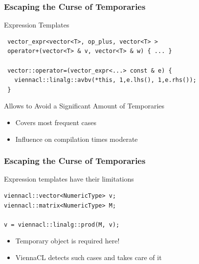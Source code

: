 \begin{frame}[fragile]
\frametitle{Escaping the Curse of Temporaries}
 \begin{block}{Expression Templates}
  \begin{lstlisting}
 vector_expr<vector<T>, op_plus, vector<T> >
 operator+(vector<T> & v, vector<T> & w) { ... }

 vector::operator=(vector_expr<...> const & e) {
   viennacl::linalg::avbv(*this, 1,e.lhs(), 1,e.rhs());
 }
  \end{lstlisting}
  \vspace*{0.5cm}

 \end{block}


  \begin{block}{Allows to Avoid a Significant Amount of Temporaries}
    \begin{itemize}
     \item Covers most frequent cases
     \item Influence on compilation times moderate
    \end{itemize}
  \end{block}
\end{frame}



\begin{frame}[fragile]
\frametitle{Escaping the Curse of Temporaries}
  \begin{block}{Expression templates have their limitations}
  \begin{lstlisting}
viennacl::vector<NumericType> v;
viennacl::matrix<NumericType> M;

v = viennacl::linalg::prod(M, v);
  \end{lstlisting}
  
    \begin{itemize}
     \item Temporary object is required here!
     \item ViennaCL detects such cases and takes care of it
    \end{itemize}
 \end{block}

\end{frame}



